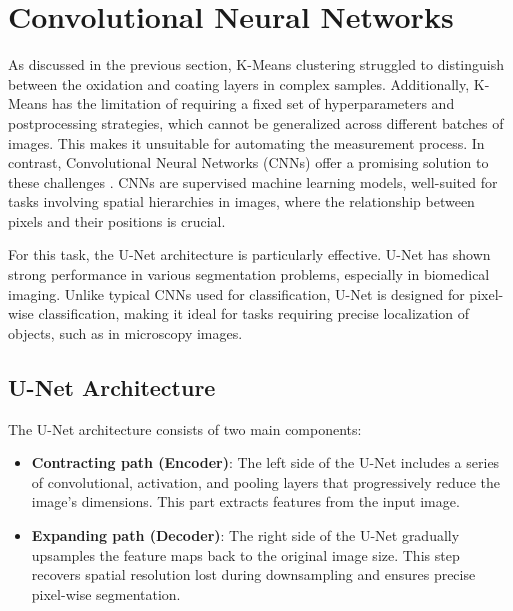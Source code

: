 
\newpage
\section{Convolutional Neural Networks}\label{sec:cnn}

As discussed in the previous section, K-Means clustering struggled to distinguish between the oxidation and coating layers in complex samples. Additionally, K-Means has the limitation of requiring a fixed set of hyperparameters and postprocessing strategies, which cannot be generalized across different batches of images. This makes it unsuitable for automating the measurement process. In contrast, Convolutional Neural Networks (CNNs)\cite{oshea_introduction_2015} offer a promising solution to these challenges . CNNs are supervised machine learning models, well-suited for tasks involving spatial hierarchies in images, where the relationship between pixels and their positions is crucial.

For this task, the U-Net architecture\cite{ronneberger2015unetconvolutionalnetworksbiomedical} is particularly effective. U-Net has shown strong performance in various segmentation problems, especially in biomedical imaging. Unlike typical CNNs used for classification, U-Net is designed for pixel-wise classification, making it ideal for tasks requiring precise localization of objects, such as in microscopy images.

\subsection{U-Net Architecture}

The U-Net architecture consists of two main components:

\begin{itemize}
    \item \textbf{Contracting path (Encoder)}: The left side of the U-Net includes a series of convolutional, activation, and pooling layers that progressively reduce the image's dimensions. This part extracts features from the input image.
    
    \item \textbf{Expanding path (Decoder)}: The right side of the U-Net gradually upsamples the feature maps back to the original image size. This step recovers spatial resolution lost during downsampling and ensures precise pixel-wise segmentation.
\end{itemize}

